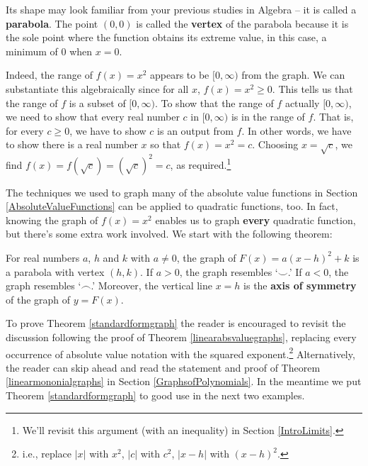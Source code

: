 \documentclass{ximera}
\begin{document}
Its shape may look familiar from your previous studies in Algebra -- it is called a  \textbf{parabola}. The point $(0,0)$ is called the \textbf{vertex} of the parabola because it is the sole point where the function obtains its extreme value, in this case, a minimum of $0$ when $x = 0$. 

\medskip

Indeed, the range of $f(x) = x^2$ appears to be $[0, \infty)$ from the graph. We can substantiate this algebraically since for all $x$, $f(x) = x^2 \geq 0$.  This tells us that the range of $f$ is a subset of $[0, \infty)$.  To show that the range of $f$ actually  $[0, \infty)$, we need to show that every real number $c$ in $[0, \infty)$ is in the range of $f$.  That is, for every $c \geq 0$, we have to show $c$ is an output from $f$.  In other words, we have to show there is a real number $x$ so that  $f(x) = x^2 = c$.  Choosing $x = \sqrt{c}$, we find $f(x) = f(\sqrt{c}) = (\sqrt{c})^2 = c$, as required.\footnote{We'll revisit this argument (with an inequality) in Section \ref{IntroLimits}.} 





The techniques we used to graph many of the absolute value functions in Section \ref{AbsoluteValueFunctions} can be applied to quadratic functions, too.  In fact, knowing the graph of $f(x) = x^2$ enables us to graph \textbf{every} quadratic function, but there's some extra work involved.  We start with the following theorem:

\medskip


\begin{theorem}  \label{standardformgraph}  For real numbers $a$, $h$ and $k$ with $a\neq 0$, the graph of  $F(x) = a(x-h)^2 + k$ is a parabola with vertex $(h,k)$.  If $a>0$, the graph resembles  `$\smile$.'  If $a<0$, the graph resembles `$\frown$.'  Moreover, the vertical line $x=h$ is the  \textbf{axis of symmetry} of the graph of $y = F(x)$.
\end{theorem}

\medskip

To prove Theorem \ref{standardformgraph} the reader is encouraged to revisit the discussion following the proof of Theorem \ref{linearabsvaluegraphs}, replacing every occurrence of absolute value notation with the squared exponent.\footnote{i.e., replace $|x|$ with $x^2$, $|c|$ with $c^2$, $|x-h|$ with $(x-h)^2$.} Alternatively, the reader can skip ahead and read the statement and proof of Theorem \ref{linearmononialgraphs} in Section \ref{GraphsofPolynomials}.  In the meantime we put Theorem \ref{standardformgraph}  to good use in the next two examples.
\end{document}
